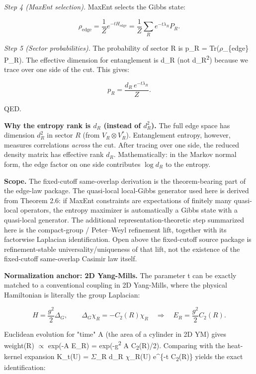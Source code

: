 \emph{Step 4 (MaxEnt selection).} MaxEnt selects the Gibbs state:

\[
\rho_{\mathrm{edge}} = \frac{1}{Z} e^{-t H_{\mathrm{edge}}} = \frac{1}{Z}
\sum_R e^{-t \lambda_R} P_R.
\]

\emph{Step 5 (Sector probabilities).} The probability of sector R is p\_R = Tr(\ensuremath{\rho}\_\{edge\} P\_R). The effective dimension for entanglement is d\_R (not d\_R\textsuperscript{2}) because we trace over one side of the cut. This gives:

\[
p_R = \frac{d_R \, e^{-t \lambda_R}}{Z}.
\]

QED.

\textbf{Why the entropy rank is \(d_R\) (instead of \(d_R^2\)).} The full edge space has dimension \(d_R^2\) in sector \(R\) (from \(V_R \otimes V_R^\ast\)). Entanglement entropy, however, measures correlations \emph{across} the cut. After tracing over one side, the reduced density matrix has effective rank \(d_R\). Mathematically: in the Markov normal form, the edge factor on one side contributes \(\log d_R\) to the entropy.

\textbf{Scope.} The fixed-cutoff same-overlap derivation is the theorem-bearing part of the
edge-law package. The quasi-local local-Gibbs generator used here is derived from Theorem 2.6:
if MaxEnt constraints are expectations of finitely many quasi-local operators, the entropy
maximizer is automatically a Gibbs state with a quasi-local generator. The additional
representation-theoretic step summarized here is the compact-group / Peter--Weyl refinement
lift, together with its factorwise Laplacian identification. Open above the
fixed-cutoff source package is refinement-stable universality/uniqueness of that lift, not the
existence of the fixed-cutoff same-overlap Casimir law itself.

\textbf{Normalization anchor: 2D Yang-Mills.} The parameter t can be exactly matched to a conventional coupling in 2D Yang-Mills, where the physical Hamiltonian is literally the group Laplacian:

\[
H = \frac{g^2}{2} \Delta_G, \qquad
\Delta_G \chi_R = -C_2(R) \chi_R
\quad \Rightarrow \quad
E_R = \frac{g^2}{2} C_2(R).
\]

Euclidean evolution for "time" A (the area of a cylinder in 2D YM) gives weight(R) \ensuremath{\propto} exp(-A E\_R) = exp(-g\textsuperscript{2} A C\textsubscript{2}(R)/2). Comparing with the heat-kernel expansion K\_t(U) = \ensuremath{\Sigma}\_R d\_R \ensuremath{\chi}\_R(U) e\^{}\{-t C\textsubscript{2}(R)\} yields the exact identification:

